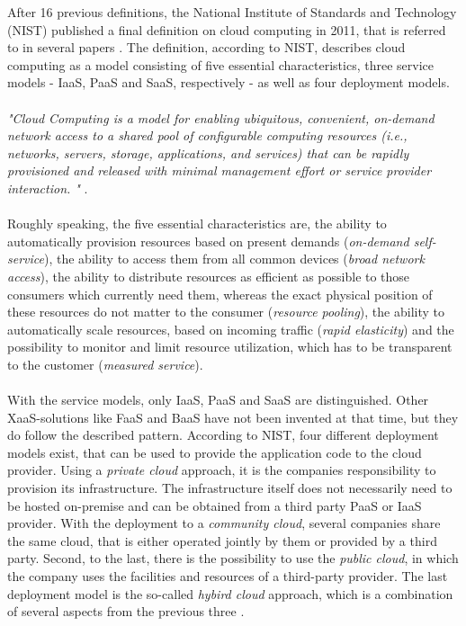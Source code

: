 \documentclass[a4paper,twoside,11pt, pagesize]{scrartcl}
\begin{document}
\begin{spacing}{1.2}
After 16 previous definitions, the National Institute of Standards and Technology (NIST) published a final definition on cloud computing in 2011, that is referred to in several papers \cite{mell2011nist}. The definition, according to NIST, describes cloud computing as a model consisting of five essential characteristics, three service models - IaaS, PaaS and SaaS, respectively - as well as four deployment models. \\\\ \textit{"Cloud Computing is a model for enabling ubiquitous, convenient, on-demand network access to a shared pool of configurable computing resources (i.e., networks, servers, storage, applications, and services) that can be rapidly provisioned and released with minimal management effort or service provider interaction. "} \cite{mell2011nist}.\\\\ Roughly speaking, the five essential characteristics are, the ability to automatically provision resources based on present demands (\textit{on-demand self-service}), the ability to access them from all common devices (\textit{broad network access}), the ability to distribute resources as efficient as possible to those consumers which currently need them, whereas the exact physical position of these resources do not matter to the consumer (\textit{resource pooling}), the ability to automatically scale resources, based on incoming traffic (\textit{rapid elasticity}) and the possibility to monitor and limit resource utilization, which has to be transparent to the customer (\textit{measured service}). \\\\ With the service models, only IaaS, PaaS and SaaS are distinguished. Other XaaS-solutions like FaaS and BaaS have not been invented at that time, but they do follow the described pattern. According to NIST, four different deployment models exist, that can be used to provide the application code to the cloud provider. Using a \textit{private cloud} approach, it is the companies responsibility to provision its infrastructure. The infrastructure itself does not necessarily need to be hosted on-premise and can be obtained from a third party PaaS or IaaS provider. With the deployment to a \textit{community cloud}, several companies share the same cloud, that is either operated jointly by them or provided by a third party. Second, to the last, there is the possibility to use the \textit{public cloud}, in which the company uses the facilities and resources of a third-party provider. The last deployment model is the so-called \textit{hybird cloud} approach, which is a combination of several aspects from the previous three \cite{mell2011nist}.

\end{spacing}
\end{document}

